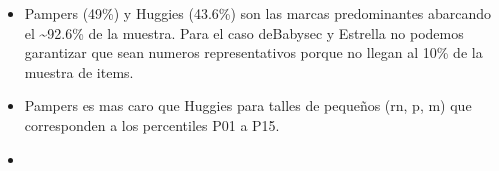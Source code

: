 \documentclass[
]{article}
\providecommand{\tightlist}{%
  \setlength{\itemsep}{0pt}\setlength{\parskip}{0pt}}
\begin{document}
\begin{itemize}
\tightlist
\item
  Pampers (49\%) y Huggies (43.6\%) son las marcas predominantes
  abarcando el \textasciitilde92.6\% de la muestra. Para el caso
  deBabysec y Estrella no podemos garantizar que sean numeros
  representativos porque no llegan al 10\% de la muestra de items.
\item
  Pampers es mas caro que Huggies para talles de pequeños (rn, p, m) que
  corresponden a los percentiles P01 a P15.
\item
\end{itemize}
\end{document}

